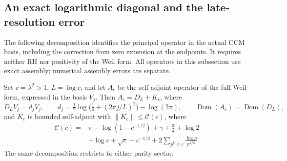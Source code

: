 \subsection{An exact logarithmic diagonal and the late-resolution error}
\label{ssec:logdiag}

The following decomposition identifies the principal operator in the actual
CCM basis, including the correction from zero extension at the endpoints.
It requires neither RH nor positivity of the Weil form. All operators in this
subsection use exact assembly; numerical assembly errors are separate.

\begin{proposition}\label{prop:logdiag}
Set $c=\lambda^2>1$, $L=\log c$, and let $A_c$ be the self-adjoint operator
of the full Weil form, expressed in the basis $V_j$. Then $A_c=D_L+K_c$,
where
\[
 D_LV_j=d_jV_j,\qquad
 d_j=\tfrac12\log\bigl(\tfrac14+(2\pi j/L)^2\bigr)-\log(2\pi),
 \qquad \operatorname{Dom}(A_c)=\operatorname{Dom}(D_L),
\]
and $K_c$ is bounded self-adjoint with $\|K_c\|\le\mathcal C(c)$, where
\begin{align}
 \mathcal C(c)={}&\pi-\log(1-c^{-1/2})+\gamma+\tfrac\pi2+\log2
 \nonumber\\
 &+\log c+\sqrt c-c^{-1/2}
   +2\sum_{p^k\le c}\frac{\log p}{p^{k/2}}.\label{eq:logdiagconstant}
\end{align}
The same decomposition restricts to either parity sector.
\end{proposition}
